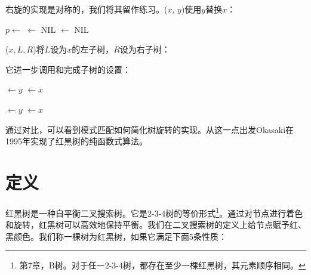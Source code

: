 \documentclass[b5paper]{ctexart}
\begin{document}
右旋的实现是对称的，我们将其留作练习。($x$, $y$)使用$y$替换$x$：

\begin{algorithmic}[1]
  \State $p \gets$ 
   
            $\gets$ NIL
    \EndIf
    \State {}
  \Else
    \State {}
  \EndIf
  \State {} $\gets$ NIL
\EndFunction
\end{algorithmic}

($x, L, R$)将$L$设为$x$的左子树，$R$设为右子树：

\begin{algorithmic}[1]
  \State {}
  \State {}
\EndFunction
\end{algorithmic}

它进一步调用和完成子树的设置：

\begin{algorithmic}[1]
  \State {} $\gets y$
     $\gets x$
  \EndIf
  \EndFunction

\Statex

  \State {} $\gets y$
     $\gets x$
  \EndIf
\EndFunction
\end{algorithmic}

通过对比，可以看到模式匹配如何简化树旋转的实现。从这一点出发Okasaki在1995年实现了红黑树的纯函数式算法\cite{okasaki}。

\begin{Exercise}
\end{Exercise}

\section{定义}

红黑树是一种自平衡二叉搜索树\cite{wiki-rbt}。它是2-3-4树的等价形式\footnote{第7章，B树。对于任一2-3-4树，都存在至少一棵红黑树，其元素顺序相同。}。通过对节点进行着色和旋转，红黑树可以高效地保持平衡。我们在二叉搜索树的定义上给节点赋予红、黑颜色。我们称一棵树为红黑树，如果它满足下面5条性质\cite{CLRS}：
\end{document}
